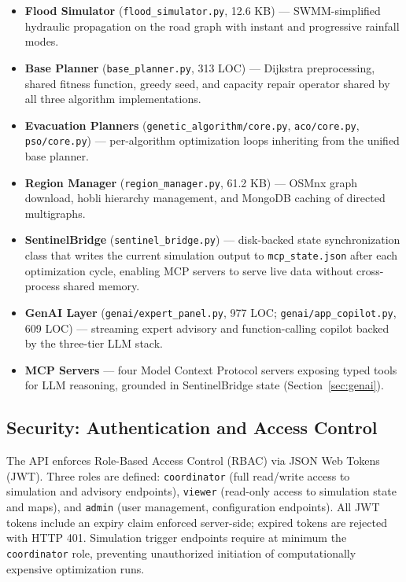 \documentclass[journal]{IEEEtran}
\begin{document}
\begin{itemize}
  \item \textbf{Flood Simulator} (\texttt{flood\_simulator.py}, 12.6 KB) — SWMM-simplified
  hydraulic propagation on the road graph with instant and progressive rainfall modes.

  \item \textbf{Base Planner} (\texttt{base\_planner.py}, 313 LOC) — Dijkstra preprocessing,
  shared fitness function, greedy seed, and capacity repair operator shared by all three
  algorithm implementations.

  \item \textbf{Evacuation Planners} (\texttt{genetic\_algorithm/core.py},
  \texttt{aco/core.py}, \texttt{pso/core.py}) — per-algorithm optimization loops inheriting
  from the unified base planner.

  \item \textbf{Region Manager} (\texttt{region\_manager.py}, 61.2 KB) — OSMnx graph
  download, hobli hierarchy management, and MongoDB caching of directed multigraphs.

  \item \textbf{SentinelBridge} (\texttt{sentinel\_bridge.py}) — disk-backed state
  synchronization class that writes the current simulation output to \texttt{mcp\_state.json}
  after each optimization cycle, enabling MCP servers to serve live data without
  cross-process shared memory.

  \item \textbf{GenAI Layer} (\texttt{genai/expert\_panel.py}, 977 LOC;
  \texttt{genai/app\_copilot.py}, 609 LOC) — streaming expert advisory and
  function-calling copilot backed by the three-tier LLM stack.

  \item \textbf{MCP Servers} — four Model Context Protocol servers exposing typed tools
  for LLM reasoning, grounded in SentinelBridge state (Section~\ref{sec:genai}).
\end{itemize}

\subsection{Security: Authentication and Access Control}

The API enforces Role-Based Access Control (RBAC) via JSON Web Tokens (JWT). Three roles
are defined: \texttt{coordinator} (full read/write access to simulation and advisory
endpoints), \texttt{viewer} (read-only access to simulation state and maps), and
\texttt{admin} (user management, configuration endpoints). All JWT tokens include an
expiry claim enforced server-side; expired tokens are rejected with HTTP 401. Simulation
trigger endpoints require at minimum the \texttt{coordinator} role, preventing unauthorized
initiation of computationally expensive optimization runs.
\end{document}
